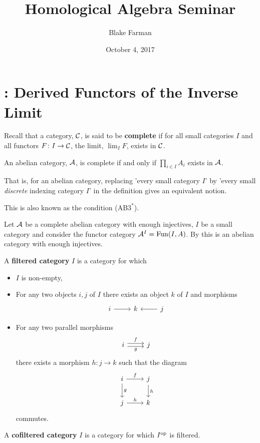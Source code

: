 \documentclass[reqno, 12pt]{amsart}
\title[Seminar]{Homological Algebra Seminar}
\author{Blake Farman}
\date{October 4, 2017}
\begin{document}
\maketitle

\section{\cite[Section 3.5]{Weibel95}: Derived Functors of the Inverse Limit}

Recall that a category, $\mathcal{C}$, is said to be \textbf{complete} if for all small categories $I$ and all functors $F \colon I \to \mathcal{C}$, the limit, $\lim_I F$, exists in $\mathcal{C}$.
\begin{exercise}
  An abelian category, $\mathcal{A}$, is complete if and only if
  $\prod_{i \in I} A_i$
  exists in $\mathcal{A}$.

  That is, for an abelian category, replacing 'every small category $I$' by 'every small \textit{discrete} indexing category $I$' in the definition gives an equivalent notion.
\end{exercise}

\begin{remark}
  This is also known as the condition (AB$3^\ast$).
\end{remark}

Let $\mathcal{A}$ be a complete abelian category with enough injectives, $I$ be a small category and consider the functor category $\mathcal{A}^I = \operatorname{Fun}(I,A)$.
By \cite[Example 2.3.13]{Weibel95} this is an abelian category with enough injectives.

\begin{definition}
  A \textbf{filtered category} $I$ is a category for which
  \begin{itemize}
  \item
    $I$ is non-empty,
  \item
    For any two objects $i,j$ of $I$ there exists an object $k$ of $I$ and morphisms
    $$\begin{tikzcd}
      i \arrow{r} & k & j \arrow{l}
    \end{tikzcd}$$
  \item
    For any two parallel morphisms
    $$\begin{tikzcd}
      i \arrow[shift left=.5ex]{r}{f} \arrow[swap,shift left=-.5ex]{r}{g} & j
    \end{tikzcd}$$
    there exists a morphism $h \colon j \to k$ such that the diagram
    $$\begin{tikzcd}
      i \arrow{r}{f}\arrow{d}{g}& j\arrow{d}{h}\\
        j\arrow{r}{h} & k
    \end{tikzcd}$$
    commutes.
  \end{itemize}
  A \textbf{cofiltered category} $I$ is a category for which $I^{\operatorname{op}}$ is filtered.
\end{definition}
\end{document}
